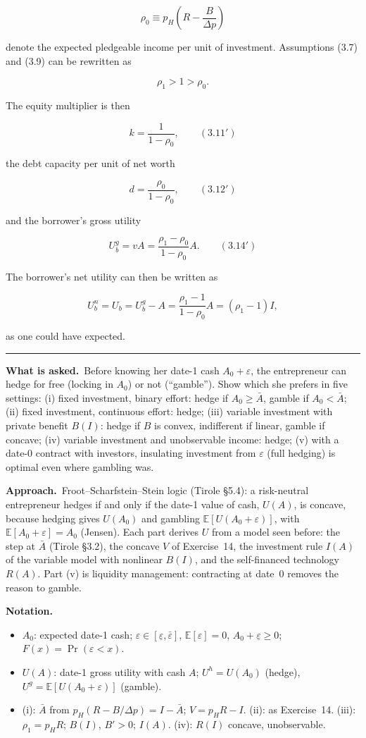 \documentclass[11pt,a4paper]{article}
\newcommand{\notation}{\par\noindent\textbf{Notation.}}
\newcommand{\asked}{\par\medskip\noindent\textbf{What is asked.}~}
\newcommand{\approach}{\par\smallskip\noindent\textbf{Approach.}~}
\newcommand{\stmtend}{\par\endgroup\nopagebreak\noindent\rule{\linewidth}{0.4pt}\par\medskip}
\begin{document}
\[\rho_0 \equiv p_H\left(R - \frac{B}{\Delta p}\right)\]

denote the expected pledgeable income per unit of investment. Assumptions (3.7) and (3.9) can be
rewritten as

\[\rho_1 > 1 > \rho_0.\]

The equity multiplier is then

\[k = \frac{1}{1 - \rho_0}, \qquad (3.11')\]

the debt capacity per unit of net worth

\[d = \frac{\rho_0}{1 - \rho_0}, \qquad (3.12')\]

and the borrower's gross utility

\[U_b^g = vA = \frac{\rho_1 - \rho_0}{1 - \rho_0} A. \qquad (3.14')\]

The borrower's net utility can then be written as

\[U_b^n = U_b = U_b^g - A = \frac{\rho_1 - 1}{1 - \rho_0} A = (\rho_1 - 1) I,\]

as one could have expected.
\stmtend

\asked Before knowing her date-1 cash $A_0+\varepsilon$, the entrepreneur can hedge for free
(locking in $A_0$) or not (``gamble''). Show which she prefers in five settings: (i) fixed
investment, binary effort: hedge if $A_0\ge\bar A$, gamble if $A_0<\bar A$; (ii) fixed
investment, continuous effort: hedge; (iii) variable investment with private benefit $B(I)$:
hedge if $B$ is convex, indifferent if linear, gamble if concave; (iv) variable investment and
unobservable income: hedge; (v) with a date-0 contract with investors, insulating investment from
$\varepsilon$ (full hedging) is optimal even where gambling was.

\approach Froot--Scharfstein--Stein logic (Tirole \S5.4): a risk-neutral entrepreneur hedges if
and only if the date-1 value of cash, $U(A)$, is concave, because hedging gives $U(A_0)$ and
gambling $\mathbb{E}[U(A_0+\varepsilon)]$, with $\mathbb{E}[A_0+\varepsilon]=A_0$ (Jensen). Each
part derives $U$ from a model seen before: the step at $\bar A$ (Tirole \S3.2), the concave $V$
of Exercise~14, the investment rule $I(A)$ of the variable model with nonlinear $B(I)$, and the
self-financed technology $R(A)$. Part (v) is liquidity management: contracting at date~0 removes
the reason to gamble.

\notation
\begin{itemize}
  \item $A_0$: expected date-1 cash; $\varepsilon\in[\underline\varepsilon,\bar\varepsilon]$, $\mathbb{E}[\varepsilon]=0$, $A_0+\underline\varepsilon\ge 0$; $F(x)=\Pr(\varepsilon<x)$.
  \item $U(A)$: date-1 gross utility with cash $A$; $U^h=U(A_0)$ (hedge), $U^g=\mathbb{E}[U(A_0+\varepsilon)]$ (gamble).
  \item (i): $\bar A$ from $p_H(R-B/\Delta p)=I-\bar A$; $V=p_HR-I$. (ii): as Exercise~14. (iii): $\rho_1=p_HR$; $B(I)$, $B'>0$; $I(A)$. (iv): $R(I)$ concave, unobservable.
\end{itemize}
\end{document}

